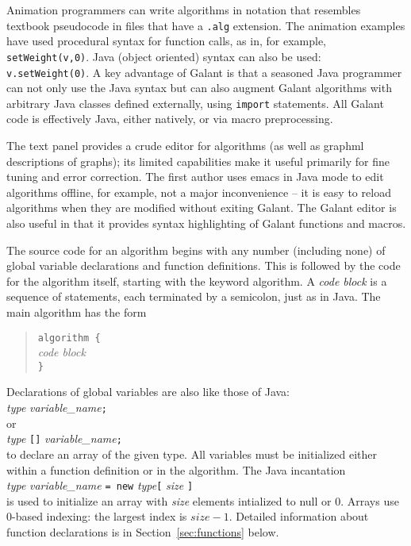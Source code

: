 Animation programmers can write algorithms in notation that resembles
textbook pseudocode
in files that have a \texttt{.alg} extension.
The animation examples have used procedural syntax for function calls, as in, for example,
\texttt{setWeight(v,0)}.
Java (object oriented) syntax can also be used: \texttt{v.setWeight(0)}.
A key advantage of Galant is that a seasoned Java programmer can
not only use the Java syntax but can also augment Galant algorithms with
arbitrary Java classes defined externally, using \texttt{import} statements.
All Galant code is effectively Java, either natively, or via macro preprocessing.

The text panel provides a crude editor for algorithms (as well as graphml
descriptions of graphs);
its limited capabilities make it useful primarily for fine tuning and error correction.
The first author uses emacs in Java mode to edit algorithms offline, for example,
not a major inconvenience -- it is easy to reload algorithms when they are modified
without exiting Galant.
The Galant editor is also useful in that it provides syntax highlighting of Galant
functions and macros.

The source code for an algorithm begins with any number (including none)
of global variable declarations and function definitions.
This is followed by the code for the algorithm itself, starting with the keyword
\textsf{algorithm}.
A \emph{code block}
is a sequence of statements, each terminated by a semicolon, just as in
Java.
The main algorithm has the form
\begin{quote}
\texttt{algorithm \{}\\
\hspace*{2em}\emph{code block}\\
\texttt{\}}
\end{quote}

Declarations of global variables are also like those of Java:\\
\hspace*{1em}\emph{type} \emph{variable\_name}\texttt{;}\\
or\\
\hspace*{1em}\emph{type} \texttt{[]} \emph{variable\_name}\texttt{;}\\
to declare an array of the given type.
All variables must be initialized either within a function definition or
in the algorithm.
The Java incantation\\
\hspace*{1em}\emph{type} \emph{variable\_name}
\texttt{= new} \emph{type}\texttt{[} \emph{size} \texttt{]}\\
is used to initialize an array with \emph{size} elements intialized to \textsf{null}
or 0.
Arrays use 0-based indexing: the largest index is $\mathit{size} - 1$.
Detailed
information about function declarations is in Section~\ref{sec:functions}
below.

